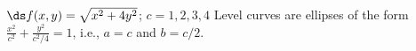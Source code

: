 {$\ds f(x,y) = \sqrt{x^2+4y^2}$; $c = 1,2,3,4$\label{12_01_ex_21}}
{Level curves are ellipses of the form $\frac{x^2}{c^2}+\frac{y^2}{c^2/4}=1$, i.e., $a=c$ and $b=c/2$.\\
}